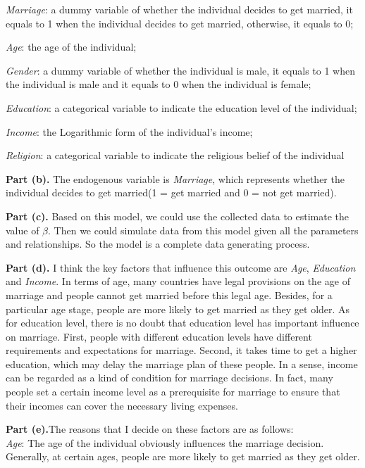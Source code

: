 \documentclass[letterpaper,12pt]{article}
\theoremstyle{definition}
\begin{document}
\emph{Marriage}:  a dummy variable of whether the individual decides to get married, it equals to 1 when the individual decides to get married, otherwise, it equals to 0;

\emph{Age}: the age of the individual;

\emph{Gender}: a dummy variable of whether the individual is male, it equals to 1 when the individual is male and it equals to 0 when the individual is female;

\emph{Education}:  a categorical variable to indicate the education level of the individual;

\emph{Income}: the Logarithmic form of the individual’s income;

\emph{Religion}: a categorical variable to indicate the religious belief of the individual

\textbf{Part (b).} The endogenous variable is \emph{Marriage}, which represents whether the individual decides to get married(1 = get married and 0 = not get married).

\textbf{Part (c).} Based on this model, we could use the collected data to estimate the value of $\beta$. Then we could simulate data from this model given all the parameters and relationships. So the model is a complete data generating process.

\textbf{Part (d).} I think the key factors that influence this outcome are \emph{Age}, \emph{Education} and \emph{Income}. In terms of age, many countries have legal provisions on the age of marriage and people cannot get married before this legal age. Besides, for a particular age stage, people are more likely to get married as they get older. As for education level, there is no doubt that education level has important influence on marriage. First, people with different education levels have different requirements and expectations for marriage. Second, it takes time to get a higher education, which may delay the marriage plan of these people. In a sense, income can be regarded as a kind of condition for marriage decisions. In fact, many people set a certain income level as a prerequisite for marriage to ensure that their incomes can cover the necessary living expenses.

\textbf{Part (e).}The reasons that I decide on these factors are as follows:\\
\emph{Age}: The age of the individual obviously influences the marriage decision. Generally, at certain ages, people are more likely to get married as they get older.
\end{document}
